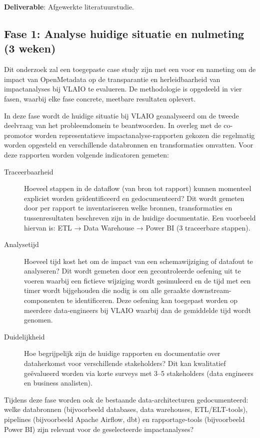 \textbf{Deliverable}: Afgewerkte literatuurstudie.

\subsection{Fase 1: Analyse huidige situatie en nulmeting (3 weken)}

Dit onderzoek zal een toegepaste case study zijn met een voor en nameting om de impact van OpenMetadata op de transparantie en herleidbaarheid van impactanalyses bij VLAIO te evalueren. De methodologie is opgedeeld in vier fasen, waarbij elke fase concrete, meetbare resultaten oplevert.

In deze fase wordt de huidige situatie bij VLAIO geanalyseerd om de tweede deelvraag van het probleemdomein te beantwoorden. In overleg met de co-promotor worden representatieve impactanalyse-rapporten gekozen die regelmatig worden opgesteld en verschillende databronnen en transformaties omvatten. Voor deze rapporten worden volgende indicatoren gemeten:

\begin{description}
    \item[Traceerbaarheid] Hoeveel stappen in de dataflow (van bron tot rapport) kunnen momenteel expliciet worden geïdentificeerd en gedocumenteerd? Dit wordt gemeten door per rapport te inventariseren welke bronnen, transformaties en tussenresultaten beschreven zijn in de huidige documentatie. Een voorbeeld hiervan is: ETL → Data Warehouse → Power BI (3 traceerbare stappen). 
    \item[Analysetijd] Hoeveel tijd kost het om de impact van een schemawijziging of datafout te analyseren? Dit wordt gemeten door een gecontroleerde oefening uit te voeren waarbij een fictieve wijziging wordt gesimuleerd en de tijd met een timer wordt bijgehouden die nodig is om alle geraakte downstream-componenten te identificeren. Deze oefening kan toegepast worden op meerdere data-engineers bij VLAIO waarbij dan de gemiddelde tijd wordt genomen. 

    \item[Duidelijkheid] Hoe begrijpelijk zijn de huidige rapporten en documentatie over dataherkomst voor verschillende stakeholders? Dit kan kwalitatief geëvalueerd worden via korte surveys met 3–5 stakeholders (data engineers en business analisten).
\end{description}

Tijdens deze fase worden ook de bestaande data-architecturen gedocumenteerd: welke databronnen (bijvoorbeeld databases, data warehouses, ETL/ELT-tools), pipelines (bijvoorbeeld Apache Airflow, dbt) en rapportage-tools (bijvoorbeeld Power BI) zijn relevant voor de geselecteerde impactanalyses?


